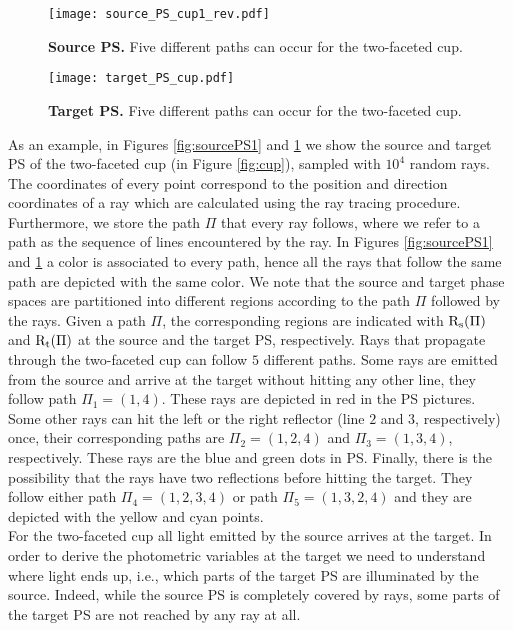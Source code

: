 \begin{figure}[t]
  \begin{minipage}[]{0.49\textwidth}
\centering
    \texttt{[image: source\_PS\_cup1\_rev.pdf]}
    \caption{\textbf{Source PS.} Five different paths can occur for the two-faceted cup.}
    \label{fig:sourcePS1}
  \end{minipage}
\hfill
  \begin{minipage}[]{0.49\textwidth}
\centering
    \texttt{[image: target\_PS\_cup.pdf]}
  \caption{\textbf{Target PS.} Five different paths can occur for the two-faceted cup.}
   \label{fig:targetPS1}
 \end{minipage}
\end{figure}
As an example, in Figures \ref{fig:sourcePS1} and \ref{fig:targetPS1} we show the source and target PS of the two-faceted cup (in Figure \ref{fig:cup}), sampled with $10^4$ random rays. The coordinates of every point correspond to the position and direction coordinates of a ray which are calculated using the ray tracing procedure. Furthermore, we store the path $\Pi$ that every ray follows, where we refer to a path as the sequence of lines encountered by the ray.
In Figures \ref{fig:sourcePS1} and \ref{fig:targetPS1} a color is associated to every path, hence all the rays that follow the same path are depicted with the same color.
We note that the source and target phase spaces are partitioned into different regions according to the path $\Pi$ followed by the rays.
Given a path $\Pi$, the corresponding regions are indicated with $\mbox{$\textup{R}$}_\textrm{s}(\Pi)$ and $\mbox{$\textup{R}$}_\textrm{t}(\Pi)$ at the source and the target PS, respectively.
Rays that propagate through the two-faceted cup can follow $5$ different paths. Some rays are emitted from the source and arrive at the target without hitting any other line, they follow path $\Pi_1= (1,4)$. These rays are depicted in red in the PS pictures. Some other rays can hit the left or the right reflector (line $2$ and $3$, respectively) once, their corresponding paths are $\Pi_2 = (1,2,4)$ and $\Pi_3 = (1,3,4)$, respectively. These rays are the blue and green dots in PS. Finally, there is the possibility that the rays have two reflections before hitting the target. They follow either path $\Pi_4 = (1,2,3,4)$ or path $\Pi_5 = (1,3,2,4)$ and they are depicted with the yellow and cyan points.
\\ \indent For the two-faceted cup all light emitted by the source arrives at the target. In order to derive the photometric variables at the target we need to understand where light ends up, i.e., which parts of the target PS are illuminated by the source. Indeed, while the source PS is completely covered by rays, some parts of the target PS are not reached by any ray at all.
